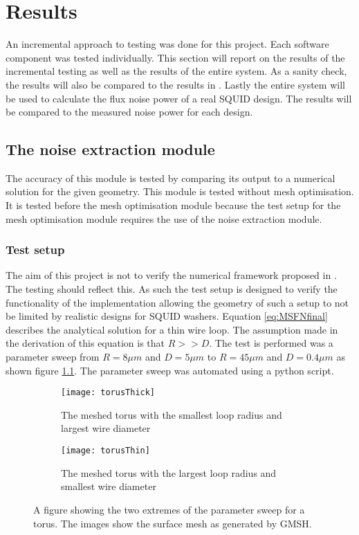 \graphicspath{{results/fig/}}

\chapter{Results}
\label{chap:results}
An incremental approach to testing was done for this project. Each software component was tested individually. This section will report on the results of the incremental testing as well as the results of the entire system. As a sanity check, the results will also be compared to the results in \cite{fluxNoiseSquidsStevenAnton}. Lastly the entire system will be used to calculate the flux noise power of a real SQUID design. The results will be compared to the measured noise power for each design. 
\section{The noise extraction module}
The accuracy of this module is tested by comparing its output to a numerical solution for the given geometry. This module is tested without mesh optimisation. It is tested before the mesh optimisation module because the test setup for the mesh optimisation module requires the use of the noise extraction module.
\subsection{Test setup}
The aim of this project is not to verify the numerical framework proposed in \cite{fluxNoiseSquidsStevenAnton}. The testing should reflect this. As such the test setup is designed to verify the functionality of the implementation allowing the geometry of such a setup to not be limited by realistic designs for SQUID washers. Equation \ref{eq:MSFNfinal} describes the analytical solution for a thin wire loop. The assumption made in the derivation of this equation is that $R >> D$. The test is performed was a parameter sweep from $R = \si{8}{\mu m}$ and $D = \si{5}{\mu m}$ to $R = \si{45}{\mu m}$ and $D = \si{0.4}{\mu m}$ as shown figure \ref{fig:meshedTorus}. The parameter sweep was automated using a python script.

\begin{figure}[h]
    \centering
    \begin{subfigure}[b]{0.45\textwidth}
        \centering
        \texttt{[image: torusThick]}
        \caption{The meshed torus with the smallest loop radius and largest wire diameter}
    \end{subfigure}
    \hfill
    \begin{subfigure}[b]{0.45\textwidth}
        \centering
        \texttt{[image: torusThin]}
        \caption{The meshed torus with the largest loop radius and smallest wire diameter}
    \end{subfigure}
    \caption{A figure showing the two extremes of the parameter sweep for a torus. The images show the surface mesh as generated by GMSH.}
    \label{fig:meshedTorus}
\end{figure}
